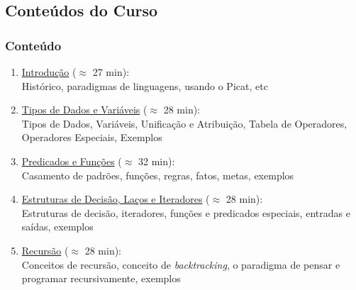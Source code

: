 \subsection{Conteúdos do Curso}
			
\begin{frame}[fragile]
  \frametitle{Conteúdo}
  \begin{enumerate}

					
    \item  \underline{Introdução} ($\approx$ 27 min):\\
    Histórico, paradigmas de linguagens, usando o Picat, etc

    \pause
    \item \underline{Tipos de Dados e Variáveis} ($\approx$ 28 min):\\
Tipos de Dados, Variáveis, Unificação e Atribuição, Tabela de Operadores, Operadores Especiais,
 Exemplos
    
    \pause
		\item \underline{Predicados e Funções} ($\approx$ 32 min):\\
Casamento de padrões, funções, regras, fatos, metas, exemplos
		
    \pause
    \item \underline{Estruturas de Decisão, Laços e Iteradores} ($\approx$ 28 min):\\
Estruturas de decisão, iteradores, funções e predicados especiais, 
entradas e saídas, exemplos
    
    \pause
		\item  \underline{Recursão} ($\approx$ 28 min):\\
     Conceitos de recursão, conceito de \textit{backtracking}, o paradigma
     de pensar e programar recursivamente, exemplos
\end{enumerate}

\end{frame}




